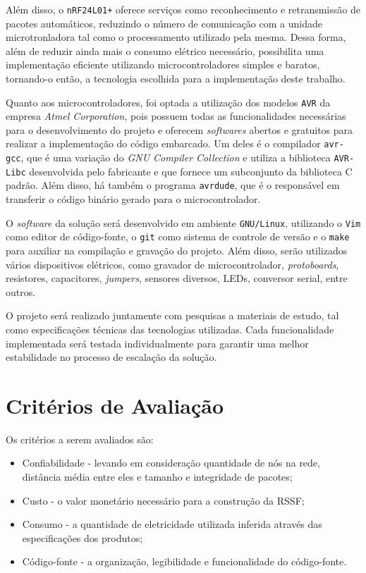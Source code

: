 \documentclass[
    12pt,               %
    a4paper,            %
    english,            %
    brazil,             %
    ]{article}
\begin{document}
Além disso, o \texttt{nRF24L01+} oferece serviços como reconhecimento e retransmissão de pacotes automáticos, reduzindo o número
de comunicação com a unidade microtronladora tal como o processamento utilizado pela mesma. Dessa forma, além de reduzir ainda
mais o consumo elétrico necessário, possibilita uma implementação eficiente utilizando microcontroladores simples e baratos,
tornando-o então, a tecnologia escolhida para a implementação deste trabalho.

Quanto aos microcontroladores, foi optada a utilização dos modelos \texttt{AVR} da empresa \textit{Atmel Corporation}, pois
possuem todas as funcionalidades necessárias para o desenvolvimento do projeto e oferecem \textit{softwares} abertos e gratuitos
para realizar a implementação do código embarcado. Um deles é o compilador \texttt{avr-gcc}, que é uma variação do \textit{GNU
Compiler Collection} e utiliza a biblioteca \texttt{AVR-Libc} desenvolvida pelo fabricante e que fornece um subconjunto da
biblioteca C padrão. Além disso, há também o programa \texttt{avrdude}, que é o responsável em transferir o código binário gerado
para o microcontrolador.

O \textit{software} da solução será desenvolvido em ambiente \texttt{GNU/Linux}, utilizando o \texttt{Vim} como editor de
código-fonte, o \texttt{git} como sistema de controle de versão e o \texttt{make} para auxiliar na compilação e gravação do
projeto. Além disso, serão utilizados vários dispositivos elétricos, como gravador de microcontrolador, \textit{protoboards},
resistores, capacitores, \textit{jumpers}, sensores diversos, LEDs, conversor serial, entre outros.

O projeto será realizado juntamente com pesquisas a materiais de estudo, tal como especificações técnicas das tecnologias
utilizadas. Cada funcionalidade implementada será testada individualmente para garantir uma melhor estabilidade no processo de
escalação da solução.


\section{Critérios de Avaliação}

Os critérios a serem avaliados são:
\begin{itemize}
	\item Confiabilidade - levando em consideração quantidade de nós na rede, distância média entre eles e tamanho e integridade de pacotes;
	\item Custo - o valor monetário necessário para a construção da RSSF;
	\item Consumo - a quantidade de eletricidade utilizada inferida através das especificações dos produtos;
	\item Código-fonte - a organização, legibilidade e funcionalidade do código-fonte.
\end{itemize}
\end{document}
